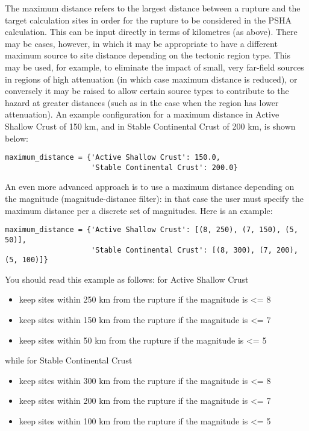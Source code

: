 The maximum distance refers to the largest distance between a rupture and the
target calculation sites in order for the rupture to be considered in the PSHA
calculation. This can be input directly in terms of kilometres (as above).
There may be cases, however, in which it may be appropriate to have a
different maximum source to site distance depending on the tectonic region
type. This may be used, for example, to eliminate the impact of small, very
far-field sources in regions of high attenuation (in which case maximum distance
is reduced), or conversely it may be raised to allow certain source types to
contribute to the hazard at greater distances (such as in the case when the
region has lower attenuation). An example configuration for a maximum distance
in Active Shallow Crust of 150 km, and in Stable Continental Crust of 200 km,
is shown below:

\begin{verbatim}
maximum_distance = {'Active Shallow Crust': 150.0,
                    'Stable Continental Crust': 200.0}
\end{verbatim}

An even more advanced approach is to use a maximum distance depending on the
magnitude (magnitude-distance filter): in that case the user must specify
the maximum distance per a discrete set of magnitudes. Here is an
example:

\begin{verbatim}
maximum_distance = {'Active Shallow Crust': [(8, 250), (7, 150), (5, 50)],
                    'Stable Continental Crust': [(8, 300), (7, 200), (5, 100)]}
\end{verbatim}

You should read this example as follows: for Active Shallow Crust

\begin{itemize}
\item keep sites within 250 km from the rupture if the magnitude is <= 8
\item keep sites within 150 km from the rupture if the magnitude is <= 7
\item keep sites within 50 km from the rupture if the magnitude is <= 5
\end{itemize}

while for Stable Continental Crust

\begin{itemize}
\item keep sites within 300 km from the rupture if the magnitude is <= 8
\item keep sites within 200 km from the rupture if the magnitude is <= 7
\item keep sites within 100 km from the rupture if the magnitude is <= 5
\end{itemize}

